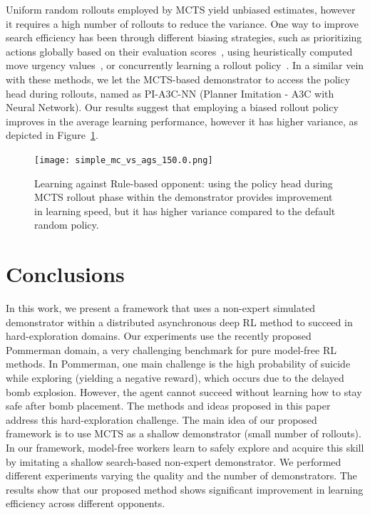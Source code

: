 \documentclass[letterpaper]{article} %
\begin{document}
Uniform random rollouts employed by MCTS yield unbiased estimates, however it requires a high number of rollouts to reduce the variance. One way to improve search efficiency has been through different biasing strategies, such as prioritizing actions globally based on their evaluation scores~\cite{kartal2014user},
using heuristically computed move urgency values~\cite{bouzy2005associating}, or concurrently learning a rollout policy~\cite{ilhan2017monte}. In a similar vein with these methods, we let the MCTS-based demonstrator to access the policy head during rollouts, named as PI-A3C-NN (Planner Imitation - A3C with Neural Network). Our results suggest that employing a biased rollout policy improves in the average learning performance, however it has higher variance, as depicted in Figure~\ref{fig:simple_rollout_biasing}.

\begin{figure}
\centering
\texttt{[image: simple\_mc\_vs\_ags\_150.0.png]}
\caption{Learning against Rule-based opponent: using the policy head during MCTS rollout phase within the demonstrator provides improvement in learning speed, but it has higher variance compared to the default random policy.}
\label{fig:simple_rollout_biasing}
\end{figure}

\vspace{-1.84mm}
\section{Conclusions}

In this work, we present a framework that uses a non-expert simulated demonstrator within a distributed asynchronous deep RL method to succeed in hard-exploration domains. Our experiments use the recently proposed Pommerman domain, a very challenging benchmark for pure model-free RL methods. In Pommerman, one main challenge is the high probability of suicide while exploring (yielding a negative reward), which occurs due to the delayed bomb explosion. However, the agent cannot succeed without learning how to stay safe after bomb placement. The methods and ideas proposed in this paper address this hard-exploration challenge. The main idea of our proposed framework is to use MCTS as a shallow demonstrator (small number of rollouts). In our framework, model-free workers learn to safely explore and acquire this skill by imitating a shallow search-based non-expert demonstrator. We performed different experiments varying the quality and the number of demonstrators. The results show that our proposed method shows significant improvement in learning efficiency across different opponents.
\end{document}
